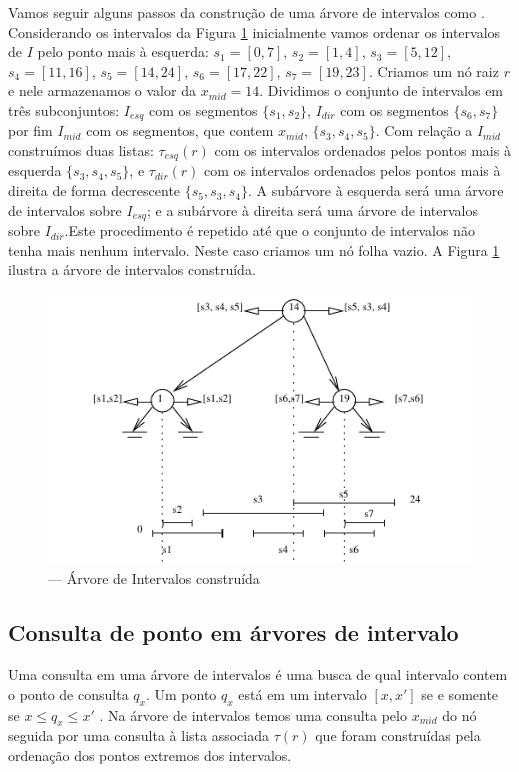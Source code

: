 Vamos seguir alguns passos da construção de uma árvore de intervalos como \cite{cgi1}. Considerando os intervalos da Figura \ref{fig:19} inicialmente vamos ordenar os intervalos de $I$ pelo ponto mais à esquerda: $s_1 = [0, 7]$, $s_2 = [1, 4]$, $s_3 = [5, 12]$, $s_4 = [11,16]$, $s_5 = [14, 24]$, $s_6 = [17, 22]$, $s_7 = [19, 23]$. Criamos um nó raiz $r$ e nele armazenamos o valor da $x_{mid}  = 14$. Dividimos o conjunto de intervalos em três subconjuntos: $I_{esq}$ com os segmentos $\{s_1, s_2\}$, $I_{dir}$ com os segmentos $\{s_6, s_7\}$ por fim $I_{mid}$ com os segmentos, que contem $x_{mid}$, $\{ s_3, s_4, s_5\}$. Com relação a $I_{mid}$ construímos duas listas: $\tau_{esq}(r)$ com os intervalos ordenados pelos pontos mais à esquerda $\{s_3,s_4,s_5\}$, e $\tau_{dir}(r)$ com os intervalos ordenados pelos pontos mais à direita de forma decrescente $\{s_5, s_3, s_4\}$. A subárvore à esquerda será uma árvore de intervalos sobre $I_{esq}$; e a subárvore à direita será uma árvore de intervalos sobre $I_{dir}$.Este procedimento é repetido até que o conjunto de intervalos não tenha mais nenhum intervalo. Neste caso criamos um nó folha vazio.
A Figura \ref{fig:19} ilustra a árvore de intervalos construída.

\begin{figure}[h!]
    \begin{center}
        \includegraphics[scale=1.5]{images/interval_tree1.pdf}
    \end{center}
    \caption {— Árvore de Intervalos construída}
    \label{fig:19}
\end{figure}

\subsection{Consulta de ponto em árvores de intervalo}
Uma consulta em uma árvore de intervalos é uma busca de qual intervalo contem o ponto de consulta $q_x$. Um ponto $q_x$ está em um intervalo $[x, x']$ se e somente se $x \leq q_x \leq x'$ \cite{cgi1}. Na árvore de intervalos temos uma consulta pelo $x_{mid}$ do nó seguida por uma consulta à lista associada $\tau(r)$ que foram construídas pela ordenação dos pontos extremos dos intervalos. 


